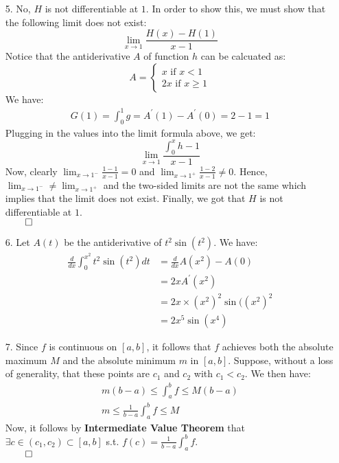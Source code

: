\documentclass[11pt]{article}
\begin{document}
\begin{itemize}
    \item[5.]
        No, $H$ is not differentiable at $1$. In order to show this, we must
        show that the following limit does not exist:
        \begin{equation*}
            \lim_{x \to 1} \frac{H(x) - H(1)}{x - 1}
        \end{equation*}
        Notice that the antiderivative $A$ of function $h$ can be calcuated as:
        \begin{equation*}
            A =
            \begin{cases}
                x \text{ if } x < 1\\
                2x \text{ if } x \geq 1
            \end{cases}
        \end{equation*}
        We have:
        \begin{align*}
            G(1) = \int_0^1 g = A^\prime(1) - A^\prime(0) = 2 - 1 = 1
        \end{align*}
        Plugging in the values into the limit formula above, we get:
        \begin{equation*}
            \lim_{x \to 1} \frac{\int_0^x h - 1}{x - 1}
        \end{equation*}
        Now, clearly $\lim_{x \to 1^-} \frac{1 - 1}{x - 1} = 0$ and $\lim_{x
        \to 1^+} \frac{1 - 2}{x - 1} \neq 0$. Hence, $\lim_{x \to 1^-} \neq
        \lim_{x \to 1^+}$ and the two-sided limits are not the same which
        implies that the limit does not exist. Finally, we got that $H$ is not
        differentiable at $1$.\\
        $\qed$

    \item[6.]
        Let $A(t)$ be the antiderivative of $t^2\sin (t^2)$. We have:
        \begin{align*}
            \frac{d}{dx} \int_0^{x^2} t^2\sin (t^2) dt
                &= \frac{d}{dx} A(x^2) - A(0)\\
                &= 2x A^\prime(x^2)\\
                &= 2x \times (x^2)^2 \sin ((x^2)^2\\
                &= 2x^5 \sin (x^4)
        \end{align*}

    \item[7.]
        Since $f$ is continuous on $[a, b]$, it follows that $f$ achieves both
        the absolute maximum $M$ and the absolute minimum $m$ in $[a, b]$.
        Suppose, without a loss of generality, that these points are $c_1$ and
        $c_2$ with $c_1 < c_2$. We then have:
        \begin{align}
            m (b - a) \leq \int_a^b f \leq M (b - a)\\
            m \leq \frac{1}{b - a} \int_a^b f \leq M
        \end{align}
        Now, it follows by \textbf{Intermediate Value Theorem} that $\exists c
        \in (c_1, c_2) \subset [a, b]$ s.t. $f(c) = \frac{1}{b - a} \int_a^b
        f$.\\
        $\qed$


\end{itemize}
\end{document}
